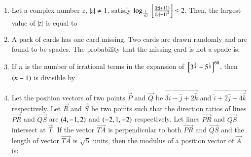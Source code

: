 \documentclass[journal]{IEEEtran}
\numberwithin{equation}{enumi}
\numberwithin{figure}{enumi}
\begin{document}
\begin{enumerate}
    \item
    Let a complex number $z$, $\left\vert z\right\vert \neq 1$, satisfy $\log_{\frac{1}{\sqrt{2}}} {}\left[\frac{\left(\left\vert z\right\vert + 11\right)}{\left(\left\vert z\right\vert - 1\right)^2}\right] \leq 2$. Then, the largest value of $\left\vert z\right\vert$ is equal to 
    
    \hfill{}
    \begin{enumerate}
    \end{enumerate}
    
    \item 
    A pack of cards has one card missing. Two cards are drawn randomly and are found to be spades. The probability that the missing card is not a spade is:
    
    \hfill{}
    \begin{enumerate}
    \end{enumerate}

    \item 
    If $n$ is the number of irrational terms in the expansion of ${}\left[3^{\frac{1}{4}} + 5^{\frac{1}{8}}\right]^{60}$, then $\left(n - 1\right)$ is divisible by
    \hfill{}
    \begin{enumerate}
    \end{enumerate}

    \item 
    Let the position vectors of two points $\vec{P}$ and $\vec{Q}$ be $\vec{3\hat{i} - \hat{j} + 2\hat{k}}$ and $\vec{\hat{i} + 2\hat{j} - 4\hat{k}}$ respectively. Let $\vec{R}$ and $\vec{S}$ be two points such that the direction ratios of lines $\vec{PR}$ and $\vec{QS}$ are $\left(4, -1, 2\right)$ and $\left(-2,1,-2\right)$ respectively. Let lines $\vec{PR}$ and $\vec{QS}$ intersect at $\vec{T}$. If the vector $\vec{TA}$ is perpendicular to both $\vec{PR}$ and $\vec{QS}$ and the length of vector $\vec{TA}$ is $\sqrt{5}$ units, then the modulus of a position vector of $\vec{A}$ is:
    

\end{enumerate}
\end{document}
